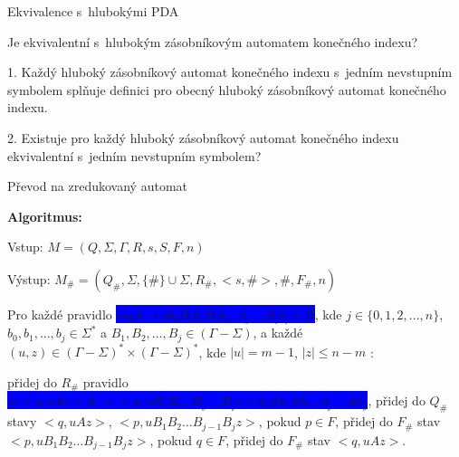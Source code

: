 \documentclass[a4paper,fyma3]{prosper}
\theoremstyle{definition}
\begin{document}
\begin{slide}{Ekvivalence s~hlubokými PDA}
\bigskip
\bigskip

Je ekvivalentní s~hlubokým zásobníkovým automatem konečného indexu?
\medskip

1. Každý hluboký zásobníkový automat konečného indexu s~jedním nevstupním symbolem splňuje definici pro obecný hluboký zásobníkový automat konečného indexu.
\medskip

2. Existuje pro každý hluboký zásobníkový automat konečného indexu ekvivalentní s~jedním nevstupním symbolem?

\end{slide}


\begin{slide}{Převod na zredukovaný automat}
\bigskip

\begin{list}{}{\setlength\parsep{0cm} \setlength\itemsep{0cm} \setlength\leftmargin{1em}}
  \item \textbf{Algoritmus:} \medskip
   \item Vstup: $M = (Q,\Sigma,\Gamma, R, s, S, F, n)$ 
   \item Výstup: $M_\# = (Q_\# ,{\Sigma},\{\#\} \cup \Sigma, R_\#, <s,\#>,  \#, F_\#, n)$ \medskip
  \item Pro každé pravidlo \colorbox{blue}{\black $mqA \rightarrow p b_0 B_1 b_1 B_2 b_2 \dots b_{j-1} B_{j} b_j \in R$}, kde $j \in \{0,1,2,\dots,n\}$, $b_0,b_1,\dots,b_j \in {\Sigma}^*$ a $B_1,B_2,\dots,B_j \in (\Gamma - \Sigma)$, 
 a každé $(u,z) \in (\Gamma - \Sigma)^* \times (\Gamma - \Sigma)^*$,  kde $|u|=m-1$, $|z|\le n-m$  : \medskip

  \subitem přidej do $R_\#$ pravidlo \colorbox{blue}{\black $m <q, u A z> \# \rightarrow <p, u B_1 B_2 \dots B_{j-1} B_{j} z> b_0 \# b_1 \# b_2 \dots b_{j-1} \# b_j $}, \medskip
  \subitem přidej do $Q_\#$ stavy $<q, u A z>$, $<p, u B_1 B_2 \dots B_{j-1} B_{j} z>$,
  \subitem pokud $p \in F$, přidej do $F_\#$ stav $<p, u B_1 B_2 \dots B_{j-1} B_{j} z>$,
  \subitem pokud $q \in F$, přidej do $F_\#$ stav $<q, u A z>$.

\end{list}


\end{slide}
\end{document}
